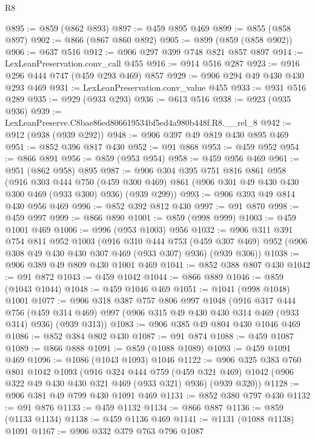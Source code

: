 \begin{lexlean}{R8}
\begin{coremodule}
@895 := @859 (@862 @893)
@897 := @459 @895 @469
@899 := @855 (@858 @897)
@902 := @866 (@867 @860 @892)
@905 := @899 (@859 (@858 @902))
@906 := @637 @516
@912 := @906 @297 @399 @748 @821 @857 @897
@914 := LexLeanPreservation.conv_call @455
@916 := @914 @516 @287
@923 := @916 @296 @444 @747 (@459 @293 @469) @857
@929 := @906 @294 @49 @430 @430 @293 @469
@931 := LexLeanPreservation.conv_value @455
@933 := @931 @516 @289
@935 := @929 (@933 @293)
@936 := @613 @516
@938 := @923 (@935 @936)
@939 := LexLeanPreserve.C8bae86ed806619534bf5ed4a980b448f.R8.__rel_8
@942 := @912 (@938 (@939 @292))
@948 := @906 @397 @49 @819 @430 @895 @469
@951 := @852 @396 @817 @430
@952 := @91 @868
@953 := @459 @952
@954 := @866 @891
@956 := @859 (@953 @954)
@958 := @459 @956 @469
@961 := @951 (@862 @958) @895
@987 := @906
    @304
    @395
    @751
    @816
    @861
    @958
    (@916
      @303
      @444
      @750
      (@459 @300 @469)
      @861
      (@906 @301 @49 @430 @430 @300 @469 (@933 @300) @936)
      (@939 @299))
@993 := @906 @393 @49 @814 @430 @956 @469
@996 := @852 @392 @812 @430
@997 := @91 @870
@998 := @459 @997
@999 := @866 @890
@1001 := @859 (@998 @999)
@1003 := @459 @1001 @469
@1006 := @996 (@953 @1003) @956
@1032 := @906
    @311
    @391
    @754
    @811
    @952
    @1003
    (@916
      @310
      @444
      @753
      (@459 @307 @469)
      @952
      (@906 @308 @49 @430 @430 @307 @469 (@933 @307) @936)
      (@939 @306))
@1038 := @906 @389 @49 @809 @430 @1001 @469
@1041 := @852 @388 @807 @430
@1042 := @91 @872
@1043 := @459 @1042
@1044 := @866 @889
@1046 := @859 (@1043 @1044)
@1048 := @459 @1046 @469
@1051 := @1041 (@998 @1048) @1001
@1077 := @906
    @318
    @387
    @757
    @806
    @997
    @1048
    (@916
      @317
      @444
      @756
      (@459 @314 @469)
      @997
      (@906 @315 @49 @430 @430 @314 @469 (@933 @314) @936)
      (@939 @313))
@1083 := @906 @385 @49 @804 @430 @1046 @469
@1086 := @852 @384 @802 @430
@1087 := @91 @874
@1088 := @459 @1087
@1089 := @866 @888
@1091 := @859 (@1088 @1089)
@1093 := @459 @1091 @469
@1096 := @1086 (@1043 @1093) @1046
@1122 := @906
    @325
    @383
    @760
    @801
    @1042
    @1093
    (@916
      @324
      @444
      @759
      (@459 @321 @469)
      @1042
      (@906 @322 @49 @430 @430 @321 @469 (@933 @321) @936)
      (@939 @320))
@1128 := @906 @381 @49 @799 @430 @1091 @469
@1131 := @852 @380 @797 @430
@1132 := @91 @876
@1133 := @459 @1132
@1134 := @866 @887
@1136 := @859 (@1133 @1134)
@1138 := @459 @1136 @469
@1141 := @1131 (@1088 @1138) @1091
@1167 := @906
    @332
    @379
    @763
    @796
    @1087

\end{coremodule}
\end{lexlean}
